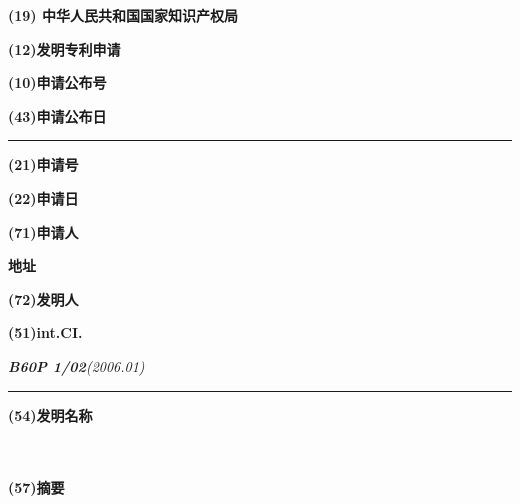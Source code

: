 \thispagestyle{empty}

\begin{flushleft}
    \textbf{{\Large(19) 中华人民共和国国家知识产权局}}
\end{flushleft}
\begin{center}
    \textbf{{\LARGE (12)发明专利申请}}
\end{center}

\begin{flushright}
    \begin{flushright}
        \textbf{(10)申请公布号}  \hspace{1}\applypublicnumber
    \end{flushright}

    \begin{flushright}
        \textbf{(43)申请公布日}  \hspace{1}\applypublicdate
    \end{flushright}
    \rule[18pt]{17.3cm}{0.1em}
\end{flushright}
\begin{flushleft}
    \textbf{(21)申请号 } \applynumber

    \textbf{(22)申请日} \hspace{1}\applydate

    \textbf{(71)申请人}\quad  \proposer

    \hspace{2.5em}\textbf{地址} \quad \authoraddress


    \textbf{(72)发明人}\quad \patentauthor

    \textbf{(51)int.CI.}

    \quad\quad\textit{\textbf{B60P 1/02}(2006.01)}
\end{flushleft}
\begin{flushright}
    \rule[16pt]{17.3cm}{0.1em}
\end{flushright}



\begin{multicols}{2}
    \begin{flushleft}
        \textbf{(54)发明名称}
    \end{flushleft}
    {\large  \patentname}\\
    \\
    \textbf{(57)摘要}

    \coverabstract
\end{multicols}
